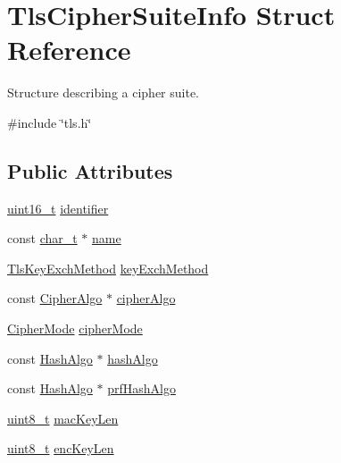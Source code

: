 \hypertarget{structTlsCipherSuiteInfo}{}\section{Tls\+Cipher\+Suite\+Info Struct Reference}
\label{structTlsCipherSuiteInfo}


Structure describing a cipher suite.  




{\ttfamily \#include \char`\"{}tls.\+h\char`\"{}}

\subsection*{Public Attributes}
\begin{DoxyCompactItemize}
\item 
\hyperlink{stdint_8h_a273cf69d639a59973b6019625df33e30}{uint16\+\_\+t} \hyperlink{structTlsCipherSuiteInfo_a17e954d45a02edb1a6dd25a490f20248}{identifier}
\item 
const \hyperlink{compiler__port_8h_a40bb5262bf908c328fbcfbe5d29d0201}{char\+\_\+t} $\ast$ \hyperlink{structTlsCipherSuiteInfo_afd829652cf80901dfbaf432fd22d1580}{name}
\item 
\hyperlink{tls_8h_a10c9078f6485419c2b8644b573ef0b75}{Tls\+Key\+Exch\+Method} \hyperlink{structTlsCipherSuiteInfo_a79b95a8e28593fdb1981bd8bf50b3d22}{key\+Exch\+Method}
\item 
const \hyperlink{structCipherAlgo}{Cipher\+Algo} $\ast$ \hyperlink{structTlsCipherSuiteInfo_a98bbb77e510d4841cf2b25e337f93233}{cipher\+Algo}
\item 
\hyperlink{cyclone__crypto_2core_2crypto_8h_ac3adaabf9bad553901589ddf3de6daf5}{Cipher\+Mode} \hyperlink{structTlsCipherSuiteInfo_a0c97190e410a53e9d5aa83d1350b967e}{cipher\+Mode}
\item 
const \hyperlink{structHashAlgo}{Hash\+Algo} $\ast$ \hyperlink{structTlsCipherSuiteInfo_a3386dc6ed6d7e5ed8b5cb9f233de1fa0}{hash\+Algo}
\item 
const \hyperlink{structHashAlgo}{Hash\+Algo} $\ast$ \hyperlink{structTlsCipherSuiteInfo_a12b0a5d8b68b1641a1800a9a469a515a}{prf\+Hash\+Algo}
\item 
\hyperlink{stdint_8h_aba7bc1797add20fe3efdf37ced1182c5}{uint8\+\_\+t} \hyperlink{structTlsCipherSuiteInfo_af6b9870391d1a8e12094db880597d48a}{mac\+Key\+Len}
\item 
\hyperlink{stdint_8h_aba7bc1797add20fe3efdf37ced1182c5}{uint8\+\_\+t} \hyperlink{structTlsCipherSuiteInfo_a2cd8770a9ef763ba4e67d2b128007cd8}{enc\+Key\+Len}

\end{DoxyCompactItemize}
